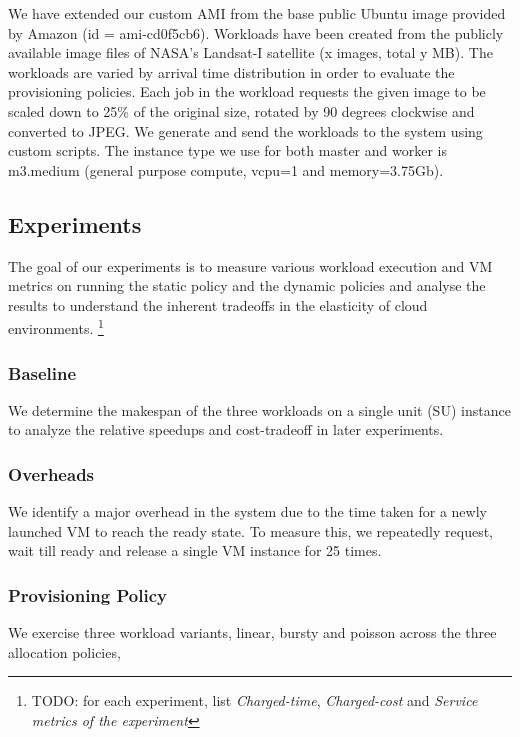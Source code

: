\documentclass[a4paper]{IEEEtran}
\begin{document}
 We have extended our custom AMI from the base public Ubuntu image provided by Amazon (id = ami-cd0f5cb6). Workloads have been created from the publicly available image files of NASA's 
 Landsat-I satellite (x images, total y MB). The workloads are varied by arrival time distribution in order to evaluate the provisioning policies. Each job in the workload requests the given image
 to be scaled down to 25\% of the original size, rotated by 90 degrees clockwise and converted to
  JPEG. We generate and send the workloads to the system using custom scripts. The instance type 
  we use for both master and worker is m3.medium (general purpose compute, vcpu=1 and memory=3.75Gb).

\subsection{Experiments}

The goal of our experiments is to measure various workload execution and VM metrics on running the
 static policy and the dynamic policies and analyse the results to understand the inherent
 tradeoffs in the elasticity of cloud environments. \footnote{TODO: for each experiment, list
  \emph{Charged-time}, \emph{Charged-cost} and \emph{Service metrics of the experiment}
}
 
\subsubsection{Baseline}

We determine the makespan of the three workloads on a single unit (SU) instance to analyze 
the relative speedups and cost-tradeoff in later experiments.

\subsubsection{Overheads}

We identify a major overhead in the system due to the time taken for a newly launched VM to 
reach the ready state. To measure this, we repeatedly request, wait till ready and release a 
single VM instance for 25 times.

\subsubsection{Provisioning Policy}

We exercise three workload variants, linear, bursty and poisson across the three allocation policies,
\end{document}
